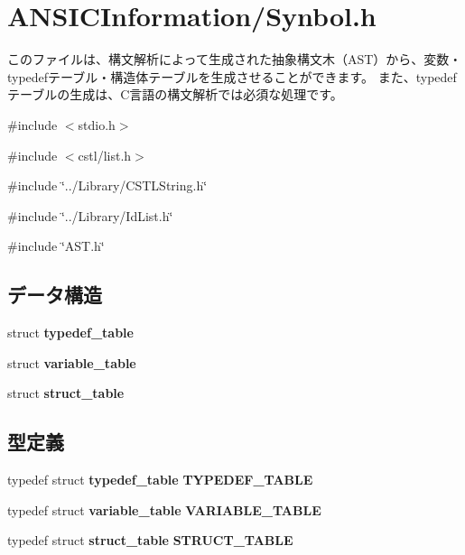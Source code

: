 \section{ANSICInformation/Synbol.h}
\label{_synbol_8h}


このファイルは、構文解析によって生成された抽象構文木（AST）から、変数・typedefテーブル・構造体テーブルを生成させることができます。 また、typedefテーブルの生成は、C言語の構文解析では必須な処理です。  


{\ttfamily \#include $<$stdio.h$>$}\par
{\ttfamily \#include $<$cstl/list.h$>$}\par
{\ttfamily \#include \char`\"{}../Library/CSTLString.h\char`\"{}}\par
{\ttfamily \#include \char`\"{}../Library/IdList.h\char`\"{}}\par
{\ttfamily \#include \char`\"{}AST.h\char`\"{}}\par
\subsection*{データ構造}
\begin{DoxyCompactItemize}
\item 
struct {\bf typedef\_\-table}
\item 
struct {\bf variable\_\-table}
\item 
struct {\bf struct\_\-table}
\end{DoxyCompactItemize}
\subsection*{型定義}
\begin{DoxyCompactItemize}
\item 
typedef struct {\bf typedef\_\-table} {\bf TYPEDEF\_\-TABLE}
\item 
typedef struct {\bf variable\_\-table} {\bf VARIABLE\_\-TABLE}
\item 
typedef struct {\bf struct\_\-table} {\bf STRUCT\_\-TABLE}
\end{DoxyCompactItemize}
